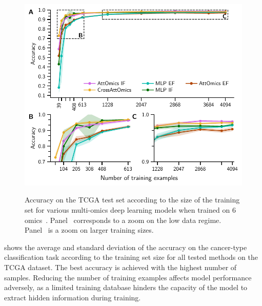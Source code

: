 \documentclass[../main.tex]{subfiles}
\begin{document}
	    \begin{figure}[htbp]
	        \centering
	        \begin{subcaptiongroup}
	            \includegraphics{limited_training_6_omics.pdf}
	            \label{fig:lim_train_6_omics_A}
	            \label{fig:lim_train_6_omics_B}
	            \label{fig:lim_train_6_omics_C}
	        \end{subcaptiongroup}
	        \caption[CrossAttOmics and other architectures accuracy on the TCGA test set according to the size of the training set]{Accuracy on the TCGA test set according to the size of the training set for various multi-omics deep learning models when trained on 6 omics~. Panel~ corresponds to a zoom on the low data regime. Panel~ is a zoom on larger training sizes.}
	        \label{fig:lim_train_6_omics}
	    \end{figure}

	     shows the average and standard deviation of the accuracy on the cancer-type classification task according to the training set size for all tested methods on the TCGA dataset.
	    The best accuracy is achieved with the highest number of samples.
	    Reducing the number of training examples affects model performance adversely, as a limited training database hinders the capacity of the model to extract hidden information during training.
\end{document}
